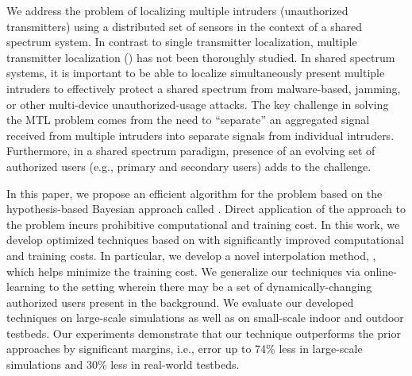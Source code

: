 We address the problem of localizing multiple intruders (unauthorized
transmitters) using a distributed set of sensors in the context of a
shared spectrum system. 
In contrast to single transmitter localization, multiple
transmitter localization (\mtl) has not been thoroughly studied.
In shared spectrum systems, it is important to be able to
localize simultaneously present multiple intruders to effectively
protect a shared spectrum from malware-based, jamming, or other
multi-device unauthorized-usage attacks. The key challenge in solving
the MTL problem comes from the need to ``separate'' an aggregated
signal received from multiple intruders into separate
signals from individual intruders. Furthermore, in a shared spectrum
paradigm, presence of an evolving set of authorized users (e.g.,
primary and secondary users) adds to the challenge.

In this paper, we propose an efficient algorithm for the \mtl problem
based on the hypothesis-based Bayesian approach called
\map. Direct application of the \map approach to
the \mtl problem incurs prohibitive computational and training
cost. In this work, we develop optimized techniques based on \map with
significantly improved computational and training costs. In
particular, we develop a novel interpolation method, \ildw, which helps
minimize the training cost. We generalize our techniques via
online-learning to the setting wherein there may be a set of
dynamically-changing authorized users present in the background.
We evaluate our developed techniques on large-scale simulations as
well as on small-scale indoor and outdoor testbeds. Our experiments
demonstrate that our technique outperforms the prior approaches by
significant margins,  i.e., error up to 74\% less in large-scale simulations and 30\% less in real-world testbeds.


